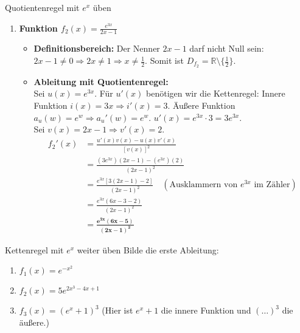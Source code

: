 \begin{loesungsumgebung}{Quotientenregel mit $e^x$ üben}
\begin{enumerate}[label=(\alph*)]
    \item \textbf{Funktion $f_2(x) = \frac{e^{3x}}{2x-1}$}
    \begin{itemize}
        \item \textbf{Definitionsbereich:} Der Nenner $2x-1$ darf nicht Null sein: $2x-1 \neq 0 \Rightarrow 2x \neq 1 \Rightarrow x \neq \frac{1}{2}$.
        Somit ist $D_{f_2} = \mathbb{R} \setminus \{\frac{1}{2}\}$.
        \item \textbf{Ableitung mit Quotientenregel:} \\
        Sei $u(x) = e^{3x}$. Für $u'(x)$ benötigen wir die Kettenregel:
        Innere Funktion $i(x)=3x \Rightarrow i'(x)=3$. Äußere Funktion $a_u(w)=e^w \Rightarrow a_u'(w)=e^w$.
        $u'(x) = e^{3x} \cdot 3 = 3e^{3x}$. \\
        Sei $v(x) = 2x-1 \Rightarrow v'(x) = 2$.
        \begin{align*}
        f_2'(x) &= \frac{u'(x)v(x) - u(x)v'(x)}{[v(x)]^2} \\
                &= \frac{(3e^{3x})(2x-1) - (e^{3x})(2)}{(2x-1)^2} \\
                &= \frac{e^{3x} [3(2x-1) - 2]}{(2x-1)^2} \quad (\text{Ausklammern von } e^{3x} \text{ im Zähler}) \\
                &= \frac{e^{3x} (6x - 3 - 2)}{(2x-1)^2} \\
                &= \mathbf{\frac{e^{3x}(6x-5)}{(2x-1)^2}}
        \end{align*}
    \end{itemize}
\end{enumerate}

\end{loesungsumgebung}

\begin{aufgabenumgebung}{Kettenregel mit $e^x$ weiter üben}
Bilde die erste Ableitung:
\begin{enumerate}
    \item $f_1(x) = e^{-x^2}$
    \item $f_2(x) = 5e^{2x^3-4x+1}$
    \item $f_3(x) = (e^x+1)^3$ (Hier ist $e^x+1$ die innere Funktion und $(\dots)^3$ die äußere.)
\end{enumerate}
\end{aufgabenumgebung}


